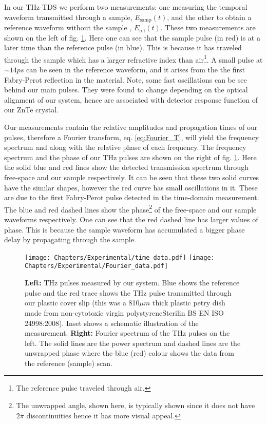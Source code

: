 In our THz-TDS we perform two measurements: one measuring the temporal waveform transmitted through a sample, $E_{\mbox{samp}}(t)$, and the other to obtain a reference waveform without the sample , $E_{\mbox{ref}}(t)$. These two measurements are shown on the left of fig. \ref{fig:extract_perm}. Here one can see that the sample pulse (in red) is at a later time than the reference pulse (in blue). This is because it has traveled through the sample which has a larger refractive index than air\footnote{The reference pulse traveled through air.}. A small pulse at $\sim 14ps$ can be seen in the reference waveform, and it arises from the the first Fabry-Perot reflection in the material. Note, some fast oscillations can be see behind our main pulses. They were found to change depending on the optical alignment of our system, hence are associated with detector response function of our ZnTe crystal.

Our measurements contain the relative amplitudes and propagation times of our pulses, therefore a Fourier transform, eq. \eqref{eq:Fourier_T}, will yield the frequency spectrum and along with the relative phase of each frequency. The frequency spectrum and the phase of our THz pulses are shown on the right of fig. \ref{fig:extract_perm}. Here the solid blue and red lines show the detected transmission spectrum through free-space and our sample respectively. It can be seen that these two solid curves have the similar shapes, however the red curve has small oscillations in it. These are due to the first Fabry-Perot pulse detected in the time-domain measurement. The blue and red dashed lines show the phase\footnote{The unwrapped angle, shown here, is typically shown since it does not have $2 \pi$ discontinuities hence it has more visual appeal.} of the free-space and our sample waveforms respectively. One can see that the red dashed line has larger values of phase. This is because the sample waveform has accumulated a bigger phase delay by propagating through the sample. 
\begin{figure}[h!]\centering
\texttt{[image: Chapters/Experimental/time\_data.pdf]} %
\texttt{[image: Chapters/Experimental/Fourier\_data.pdf]}
\caption{\textbf{Left:} THz pulses measured by our system. Blue shows the reference pulse and the red trace shows the THz pulse transmitted through our plastic cover slip (this was a 810$\mu m$ thick plastic petry dish made from non-cytotoxic virgin polystyreneSterilin BS EN ISO 24998:2008). Inset shows a schematic illustration of the measurement. \textbf{Right:} Fourier spectrum of the THz pulses on the left. The solid lines are the power spectrum and dashed lines are the unwrapped phase where the blue (red) colour shows the data from the reference (sample) scan.} %
\label{fig:extract_perm}
\end{figure}

